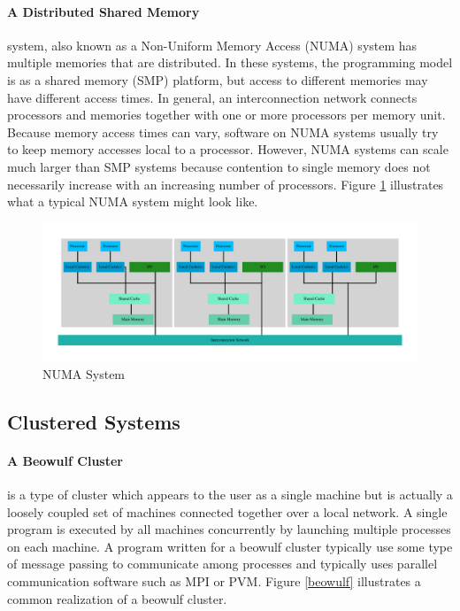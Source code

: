 \documentclass[11pt]{book}
\begin{document}
\paragraph{A Distributed Shared Memory} system, also known as a Non-Uniform Memory Access
(NUMA) system has multiple memories that are distributed.  In these systems, the programming model
is as a shared memory (SMP) platform, but access to different memories may have different access
times.  In general, an interconnection network connects processors and memories together with one or
more processors per memory unit.  Because memory access times can vary, software on NUMA systems
usually try to keep memory accesses local to a processor.  However, NUMA systems can scale much
larger than SMP systems because contention to single memory does not necessarily increase with an
increasing number of processors.  Figure \ref{distributed} illustrates what a typical NUMA system
might look like.

\begin{figure}
  \centering
  \includegraphics[width=\textwidth,quiet]{figs/graphviz/distributed.pdf}
  \caption{NUMA System}\label{distributed}
\end{figure}

\subsection{Clustered Systems}

\paragraph{A Beowulf Cluster} is a type of cluster which appears to the user as a single
machine but is actually a loosely coupled set of machines connected together over a local network.
A single program is executed by all machines concurrently by launching multiple processes on each
machine.  A program written for a beowulf cluster typically use some type of message passing to
communicate among processes and typically uses parallel communication software such as MPI or PVM.
Figure \ref{beowulf} illustrates a common realization of a beowulf cluster.
\end{document}
